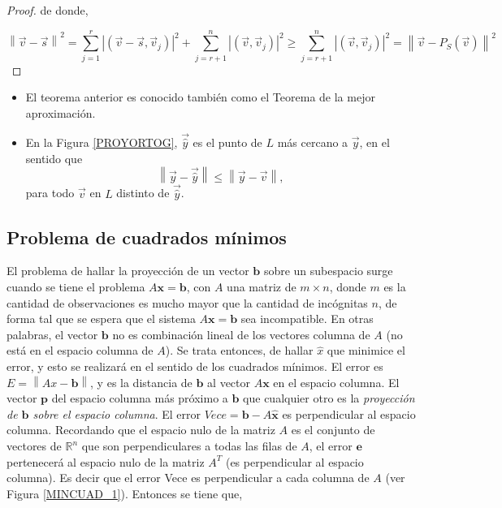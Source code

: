 {\begin{corollary}
\begin{proof}
\noindent
de donde,

$$\left\|\vec{v}-\vec{s}\right\|^2=  \sum^{r}_{j=1}   \left|(\vec{v} - \vec{s}, \vec{v}_j)\right|^2 + \sum^{n}_{j=r+1}  \left| (\vec{v}, \vec{v}_j) \right|^2  \geq    

\sum^{n}_{j=r+1}  \left| (\vec{v}, \vec{v}_j)\right|^2 = \left\|\vec{v}-P_{S}(\vec{v})\right\|^2 $$

\end{proof}

\end{corollary}

\bigskip

\begin{remark}
\begin{itemize}
    \item 
El teorema anterior es conocido también como el Teorema de la mejor aproximación.
\item
En la Figura \ref{PROYORTOG},  $\vec{\hat{y}}$ es el punto de $L$ más cercano a $\vec{y}$, en el sentido que
$$\left\|\vec{y}-\vec{\hat{y}}\right\| \leq \left\|\vec{y}-\vec{v} \right\|,$$
para todo $\vec{v}$ en $L$ distinto de $\vec{\hat{y}}$.
\end{itemize}
\end{remark}


\bigskip


\subsection{Problema de cuadrados mínimos}
El problema de hallar la proyección de  un vector $\textbf{b}$ sobre un subespacio surge cuando se tiene el problema $A\textbf{x}=\textbf{b}$, con $A$ una matriz de $m \times n$, donde $m$ es la cantidad de observaciones es mucho mayor que la cantidad de incógnitas $n$, de forma tal que se espera que el sistema $A\textbf{x}=\textbf{b}$ sea incompatible. En otras palabras, el vector $\textbf{b}$ no es combinación lineal de los vectores columna de $A$ (no está en el espacio columna de $A$). Se trata entonces, de hallar $ \hat x$ que minimice el error, y esto se realizará en el sentido de los cuadrados mínimos. El error es $E=\left\|Ax-\textbf{b}\right\|$, y es la distancia de $\textbf{b}$ al vector $A\textbf{x}$ en el espacio columna. El vector $\textbf{p}$ del espacio columna  más próximo a $\textbf{b}$ que cualquier otro es la \textit{proyección de $\textbf{b}$ sobre el espacio columna}. El error $Vec{e}=\textbf{b}-A  \hat{\textbf{x}}$ es perpendicular al espacio columna.
Recordando que  el espacio nulo de la matriz $A$ es el conjunto de vectores de $\mathbb{R}^{n}$ que son perpendiculares a todas las filas de $A$, el error $\textbf{e}$ pertenecerá al espacio nulo de la matriz $A^T$ (es perpendicular al espacio columna). Es decir que el error Vec{e} es perpendicular a cada columna de $A$  (ver Figura \ref{MINCUAD_1}). Entonces se tiene que,


}
